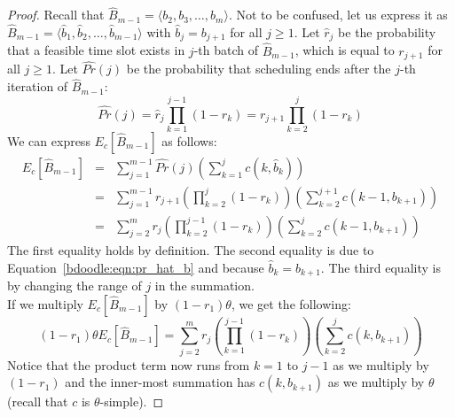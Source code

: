\begin{proof}
Recall that $\hat{B}_{m-1} = \langle b_2, b_3, \dots, b_{m} \rangle$. 
Not to be confused, let us express it as $\hat{B}_{m-1} = \langle \hat{b}_1, \hat{b}_2, \dots, \hat{b}_{m-1}\rangle$ with $\hat{b}_j = b_{j+1}$ for all $j\geq 1$. Let $\hat{r}_j$ be the probability that a feasible time slot exists in $j$-th batch of $\hat{B}_{m-1}$, which is equal to $r_{j+1}$ for all $j \geq 1$. Let $\hat{Pr}(j)$ be the probability that scheduling ends after the $j$-th iteration of $\hat{B}_{m-1}$:
\begin{equation}
	\hat{Pr}(j) 
	= \hat{r}_j \prod_{k=1}^{j-1} (1 - \hat{r}_k)
	= r_{j+1} \prod_{k=2}^{j} (1 - r_{k})  \label{bdoodle:eqn:pr_hat_b}
\end{equation}
We can express $E_c[\hat{B}_{m-1}]$ as follows:
\begin{eqnarray*}
E_c[\hat{B}_{m-1}]
&=& \sum_{j=1}^{m-1} \hat{Pr}(j) \left( \sum_{k=1}^{j} c(k, \hat{b}_k) \right) \\
&=& \sum_{j=1}^{m-1} r_{j+1} \left(\prod_{k=2}^{j} (1 - r_{k})\right) \left(\sum_{k=2}^{j+1} c(k-1, b_{k+1})\right) \\
&=& \sum_{j=2}^{m} r_{j} \left(\prod_{k=2}^{j-1} (1 - r_{k})\right) \left(\sum_{k=2}^{j} c(k-1, b_{k+1})\right)
\end{eqnarray*}
The first equality holds by definition. The second equality is due to Equation~\ref{bdoodle:eqn:pr_hat_b} and because $\hat{b}_k = b_{k+1}$. The third equality is by changing the range of $j$ in the summation. \\

If we multiply $E_c[\hat{B}_{m-1}]$ by $(1 - r_1)\theta$, we get the following:
\begin{equation} \label{bdoodle:eqn:ExpCost_Bhat}
(1-r_1)\theta E_c[\hat{B}_{m-1}] = \sum_{j=2}^{m} r_{j} \left(\prod_{k=1}^{j-1} (1 - r_{k})\right) \left(\sum_{k=2}^{j} c(k, b_{k+1})\right)
\end{equation}
Notice that the product term now runs from $k = 1$ to $j-1$ as we multiply by $(1-r_1)$ and the inner-most summation has $c(k, b_{k+1})$ as we multiply by $\theta$ (recall that $c$ is $\theta$-simple).


\end{proof}
